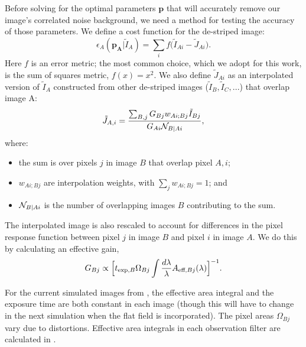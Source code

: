 \documentclass[]{pasj01}
\newcommand{\Chris}[1]{{\textcolor{red}{\bfseries{[#1]}}}}
\begin{document}
Before solving for the optimal parameters ${\boldsymbol p}$ that will accurately remove our image's correlated noise background, we need a method for testing the accuracy of those parameters. We define a cost function for the de-striped image:
\begin{equation}
\epsilon_A(\mathbf{p_{A}}|\tilde{I}_A) = \sum_{i} f \bigl( \tilde{I}_{Ai}-\tilde{J}_{Ai} \bigr) .
\label{eq:epsA} 
\end{equation}
Here $f$ is an error metric; the most common choice, which we adopt for this work, is the sum of squares metric, $f(x)=x^2$. We also define $\tilde{J}_{Ai}$ as an interpolated version of $\tilde{I}_A$ constructed from other de-striped images ($\tilde{I}_B, \tilde{I}_C, ...$) that overlap image A:
\begin{equation}
\tilde{J}_{A, i} = \frac{\sum_{B,j} G_{Bj} w_{Ai;Bj}\tilde I_{Bj}}{G_{Ai}{\cal N}_{B|Ai}} ,
\label{eq:JAi}
\end{equation}
where:
\begin{itemize}
    \item the sum is over pixels $j$ in image $B$ that overlap pixel $A, i$;
    \item $w_{Ai;Bj}$ are interpolation weights, with $\sum_j w_{Ai;Bj}=1$; and
    \item ${\cal N}_{B|Ai}$ is the number of overlapping images $B$ contributing to the sum.
\end{itemize}
The interpolated image is also rescaled to account for differences in the pixel response function between pixel $j$ in image $B$ and pixel $i$ in image $A$. We do this by calculating an effective gain,
\begin{equation}
    G_{Bj} \propto \Bigl[ t_{\text{exp},B} \Omega_{Bj} \int \frac{d\lambda}{\lambda} A_{\text{eff},Bj}(\lambda)\Bigr]^{-1}.
\label{eq:Geff}
\end{equation}

For the current simulated images from \citet{OpenUniverse2025}, the effective area integral and the exposure time are both constant in each image (though this will have to change in the next simulation when the flat field is incorporated). The pixel areas $\Omega_{Bj}$ vary due to distortions. Effective area integrals in each observation filter are calculated in \cite{Laliotis2024}. 
\end{document}
